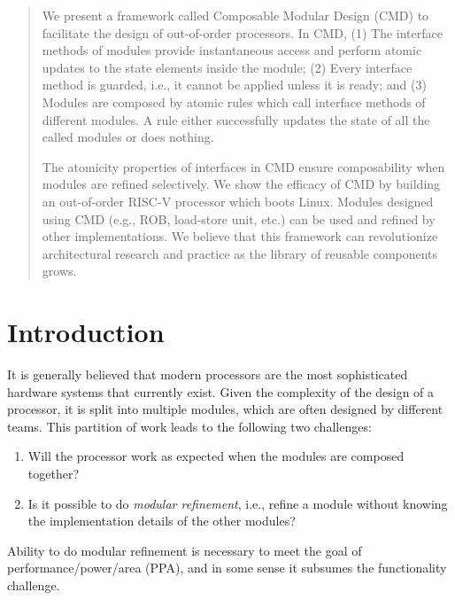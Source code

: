\documentclass[conference]{IEEEtran}
\begin{document}
\begin{abstract}
    We present a framework called Composable Modular Design (CMD) to facilitate the design of out-of-order processors. In CMD, (1) The interface methods of modules provide instantaneous access and perform atomic updates to the state elements inside the module; (2) Every interface method is guarded, i.e., it cannot be applied unless it is ready; and (3) Modules are composed by atomic rules which call interface methods of different modules. A rule either successfully updates the state of all the called modules or does nothing.
    
    The atomicity properties of interfaces in CMD ensure composability when modules are refined selectively. We show the efficacy of CMD by building an out-of-order RISC-V processor which boots Linux. Modules designed using CMD (e.g., ROB, load-store unit, etc.) can be used and refined by other implementations. We believe that this framework can revolutionize architectural research and practice as the library of reusable components grows.
\end{abstract}

\section{Introduction}\label{sec:intro}
It is generally believed that modern processors are the most sophisticated hardware systems that currently exist.
Given the complexity of the design of a processor, it is split into multiple modules, which are often designed by different teams.
This partition of work leads to the following two challenges:
\begin{enumerate}
    \item Will the processor work as expected when the modules are composed together?
    \item Is it possible to do \emph{modular refinement}, i.e., refine a module without knowing the implementation details of the other modules?
\end{enumerate}
Ability to do modular refinement is necessary to meet the goal of performance/power/area (PPA), and in some sense it subsumes the functionality challenge. 
\end{document}
